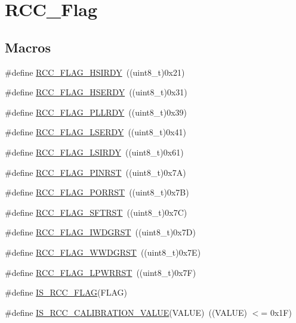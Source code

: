 \hypertarget{group___r_c_c___flag}{}\section{R\+C\+C\+\_\+\+Flag}
\label{group___r_c_c___flag}
\subsection*{Macros}
\begin{DoxyCompactItemize}
\item 
\#define \mbox{\hyperlink{group___r_c_c___flag_ga827d986723e7ce652fa733bb8184d216}{R\+C\+C\+\_\+\+F\+L\+A\+G\+\_\+\+H\+S\+I\+R\+DY}}~((uint8\+\_\+t)0x21)
\item 
\#define \mbox{\hyperlink{group___r_c_c___flag_ga173edf47bec93cf269a0e8d0fec9997c}{R\+C\+C\+\_\+\+F\+L\+A\+G\+\_\+\+H\+S\+E\+R\+DY}}~((uint8\+\_\+t)0x31)
\item 
\#define \mbox{\hyperlink{group___r_c_c___flag_gaf82d8afb18d9df75db1d6c08b9c50046}{R\+C\+C\+\_\+\+F\+L\+A\+G\+\_\+\+P\+L\+L\+R\+DY}}~((uint8\+\_\+t)0x39)
\item 
\#define \mbox{\hyperlink{group___r_c_c___flag_gac9fb963db446c16e46a18908f7fe1927}{R\+C\+C\+\_\+\+F\+L\+A\+G\+\_\+\+L\+S\+E\+R\+DY}}~((uint8\+\_\+t)0x41)
\item 
\#define \mbox{\hyperlink{group___r_c_c___flag_ga8c5e4992314d347597621bfe7ab10d72}{R\+C\+C\+\_\+\+F\+L\+A\+G\+\_\+\+L\+S\+I\+R\+DY}}~((uint8\+\_\+t)0x61)
\item 
\#define \mbox{\hyperlink{group___r_c_c___flag_gabfc3ab5d4a8a94ec1c9f38794ce37ad6}{R\+C\+C\+\_\+\+F\+L\+A\+G\+\_\+\+P\+I\+N\+R\+ST}}~((uint8\+\_\+t)0x7\+A)
\item 
\#define \mbox{\hyperlink{group___r_c_c___flag_ga39ad309070f416720207eece5da7dc2c}{R\+C\+C\+\_\+\+F\+L\+A\+G\+\_\+\+P\+O\+R\+R\+ST}}~((uint8\+\_\+t)0x7\+B)
\item 
\#define \mbox{\hyperlink{group___r_c_c___flag_gaf7852615e9b19f0b2dbc8d08c7594b52}{R\+C\+C\+\_\+\+F\+L\+A\+G\+\_\+\+S\+F\+T\+R\+ST}}~((uint8\+\_\+t)0x7\+C)
\item 
\#define \mbox{\hyperlink{group___r_c_c___flag_gaac46bac8a97cf16635ff7ffc1e6c657f}{R\+C\+C\+\_\+\+F\+L\+A\+G\+\_\+\+I\+W\+D\+G\+R\+ST}}~((uint8\+\_\+t)0x7\+D)
\item 
\#define \mbox{\hyperlink{group___r_c_c___flag_gaa80b60b2d497ccd7b7de1075009999a7}{R\+C\+C\+\_\+\+F\+L\+A\+G\+\_\+\+W\+W\+D\+G\+R\+ST}}~((uint8\+\_\+t)0x7\+E)
\item 
\#define \mbox{\hyperlink{group___r_c_c___flag_ga67049531354aed7546971163d02c9920}{R\+C\+C\+\_\+\+F\+L\+A\+G\+\_\+\+L\+P\+W\+R\+R\+ST}}~((uint8\+\_\+t)0x7\+F)
\item 
\#define \mbox{\hyperlink{group___r_c_c___flag_gaa27dea5bb62b26d0881e649770252158}{I\+S\+\_\+\+R\+C\+C\+\_\+\+F\+L\+AG}}(F\+L\+AG)
\item 
\#define \mbox{\hyperlink{group___r_c_c___flag_gafda50a08dc048f7c272bf04ec9c2c2b7}{I\+S\+\_\+\+R\+C\+C\+\_\+\+C\+A\+L\+I\+B\+R\+A\+T\+I\+O\+N\+\_\+\+V\+A\+L\+UE}}(V\+A\+L\+UE)~((V\+A\+L\+UE) $<$= 0x1\+F)
\end{DoxyCompactItemize}


